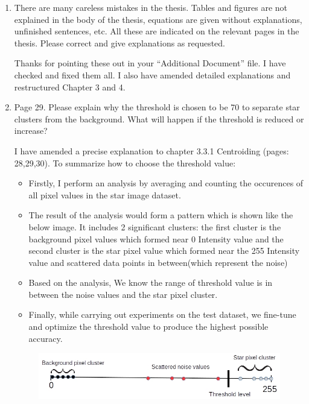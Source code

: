 \documentclass[dvips,a4paper,12pt]{report}
\begin{document}
\begin{enumerate}
    \color{blue}
    \item There are many careless mistakes in the thesis. Tables and figures are not explained in the body of the thesis, equations are given without explanations, unfinished sentences, etc. All these are indicated on the relevant pages in the thesis. Please correct and give explanations as requested.

    \color{black}
    Thanks for pointing these out in your ``Additional Document'' file. I have checked and fixed them all. I also have amended detailed explanations and restructured Chapter 3 and 4. \\

    \color{blue}
    \item Page 29. Please explain why the threshold is chosen to be 70 to separate star clusters from the background. What will happen if the threshold is reduced or increase?

    \color{black}
    I have amended a precise explanation to chapter 3.3.1 Centroiding (pages: 28,29,30). To summarize how to choose the threshold value:

    \begin{itemize}
        \item Firstly, I perform an analysis by averaging and counting the occurences of all pixel values in the star image dataset. 
        \item The result of the analysis would form a pattern which is shown like the below image. It includes 2 significant clusters: the first cluster is the background pixel values which formed near 0 Intensity value and the second cluster is the star pixel value which formed near the 255 Intensity value and scattered data points in between(which represent the noise)
        \item Based on the analysis, We know the range of threshold value is in between the noise values and the star pixel cluster.
        \item Finally, while carrying out experiments on the test dataset, we fine-tune and optimize the threshold value to produce the highest possible accuracy.
    \end{itemize}

    \begin{figure}[H]
        \centering
        \includegraphics[width=1.0\textwidth]{4}
    \end{figure}


\end{enumerate}
\end{document}
